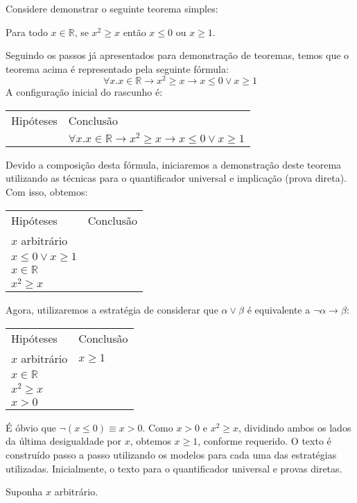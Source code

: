 \begin{Example}
Considere demonstrar o seguinte teorema simples:
\begin{flushleft}
  Para todo $x\in\mathbb{R}$, se $x^2 \geq x$ então $x \leq 0$ ou
  $x\geq 1$.
\end{flushleft}
Seguindo os passos já apresentados para demonstração de teoremas,
temos que o teorema acima é representado pela seguinte fórmula:
\[
\forall x. x \in \mathbb{R} \to x^2 \geq x \to x \leq 0 \lor x \geq 1
\]
A configuração inicial do rascunho é:
\begin{flushleft}
\begin{tabular}{ll}
Hipóteses & Conclusão \\
 & $\forall x. x \in \mathbb{R} \to x^2 \geq x \to x \leq 0 \lor x \geq 1$
\end{tabular}
\end{flushleft}
Devido a composição desta fórmula, iniciaremos a demonstração deste
teorema utilizando as técnicas para o quantificador universal e
implicação (prova direta). Com isso, obtemos:
\begin{flushleft}
\begin{tabular}{ll}
Hipóteses & Conclusão \\
 $x$ arbitrário & \\ $x \leq 0 \lor x \geq 1$\\
$x \in \mathbb{R} $ & \\
$x^2 \geq x$ &
\end{tabular}
\end{flushleft}
Agora, utilizaremos a estratégia de considerar que $\alpha\lor\beta$ é
equivalente a $\neg \alpha \to \beta$:
\begin{flushleft}
\begin{tabular}{ll}
Hipóteses & Conclusão \\
 $x$ arbitrário & $x \geq 1$\\
$x \in \mathbb{R} $ & \\
$x^2 \geq x$ &\\
$x > 0$
\end{tabular}
\end{flushleft}
É óbvio que $\neg (x\leq 0)\equiv x > 0$. Como $x > 0$ e $x^2 \geq x$,
dividindo ambos os lados da última desigualdade por $x$, obtemos
$x\geq 1$, conforme requerido. O texto é construído passo a passo
utilizando os modelos para cada uma das estratégias
utilizadas. Inicialmente, o texto para o quantificador universal e
provas diretas.
\begin{flushleft}
Suponha $x$ arbitrário.\\

\end{flushleft}
\end{Example}
